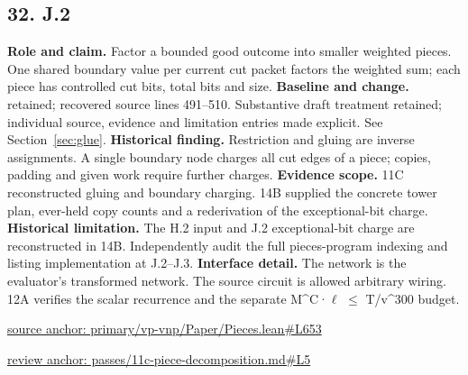 \documentclass[11pt,letterpaper]{article}
\theoremstyle{definition}\newtheorem{definition}[theorem]{Definition}\newtheorem{example}[theorem]{Example}
\theoremstyle{remark}\newtheorem{remark}[theorem]{Remark}
\begin{document}
\subsection*{32. J.2}
\textbf{Role and claim.} Factor a bounded good outcome into smaller weighted pieces. One shared boundary value per current cut packet factors the weighted sum; each piece has controlled cut bits, total bits and size.
\textbf{Baseline and change.} retained; recovered source lines 491--510. Substantive draft treatment retained; individual source, evidence and limitation entries made explicit. See Section~\ref{sec:glue}.
\textbf{Historical finding.} Restriction and gluing are inverse assignments. A single boundary node charges all cut edges of a piece; copies, padding and given work require further charges.
\textbf{Evidence scope.} 11C reconstructed gluing and boundary charging. 14B supplied the concrete tower plan, ever-held copy counts and a rederivation of the exceptional-bit charge.
\textbf{Historical limitation.} The H.2 input and J.2 exceptional-bit charge are reconstructed in 14B. Independently audit the full pieces-program indexing and listing implementation at J.2–J.3.
\textbf{Interface detail.} The network is the evaluator's transformed network. The source circuit is allowed arbitrary wiring. 12A verifies the scalar recurrence and the separate M\textasciicircum{}C·\ensuremath{\ell} \ensuremath{\le} T/v\textasciicircum{}300 budget.
\par\href{https://github.com/nousentllc/VP-VNP-Review/blob/8a7976933b6b2b4ffda1ad3a0dfb5fc6b6f023e8/primary/vp-vnp/Paper/Pieces.lean\#L653}{source anchor: primary/vp-vnp/Paper/Pieces.lean\#L653}
\par\href{https://github.com/nousentllc/VP-VNP-Review/blob/8a7976933b6b2b4ffda1ad3a0dfb5fc6b6f023e8/passes/11c-piece-decomposition.md\#L5}{review anchor: passes/11c-piece-decomposition.md\#L5}
\goodbreak
\end{document}
